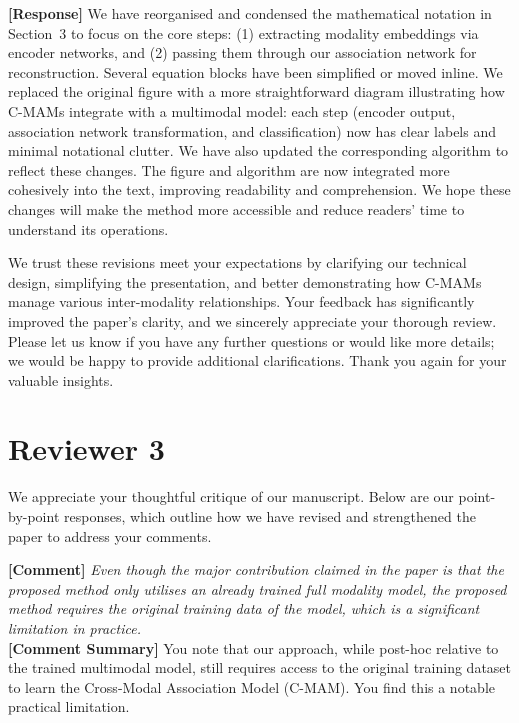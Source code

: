 \documentclass{article}
\begin{document}
\noindent\textbf{[Response]} We have reorganised and condensed the mathematical notation in Section~3 to focus on the core steps: (1) extracting modality embeddings via encoder networks, and (2) passing them through our association network for reconstruction. Several equation blocks have been simplified or moved inline. We replaced the original figure with a more straightforward diagram illustrating how C-MAMs integrate with a multimodal model: each step (encoder output, association network transformation, and classification) now has clear labels and minimal notational clutter. We have also updated the corresponding algorithm to reflect these changes. The figure and algorithm are now integrated more cohesively into the text, improving readability and comprehension. We hope these changes will make the method more accessible and reduce readers' time to understand its operations.

\vspace{0.25cm}
\hline
\vspace{0.25cm}


\noindent We trust these revisions meet your expectations by clarifying our technical design, simplifying the presentation, and better demonstrating how C-MAMs manage various inter-modality relationships. Your feedback has significantly improved the paper's clarity, and we sincerely appreciate your thorough review. Please let us know if you have any further questions or would like more details; we would be happy to provide additional clarifications. Thank you again for your valuable insights.

\section*{Reviewer 3}
We appreciate your thoughtful critique of our manuscript. Below are our point-by-point responses, which outline how we have revised and strengthened the paper to address your comments.

\vspace{0.25cm}
\hline
\vspace{0.25cm}

\noindent\textbf{[Comment]} \textit{Even though the major contribution claimed in the paper is that the proposed method only utilises an already trained full
modality model, the proposed method requires the original training data of the model, which is a significant limitation in
practice.}
\\

\noindent\textbf{[Comment Summary]} You note that our approach, while post-hoc relative to the trained multimodal model, still requires access to the original training dataset to learn the Cross-Modal Association Model (C-MAM). You find this a notable practical limitation.
\\
\end{document}
